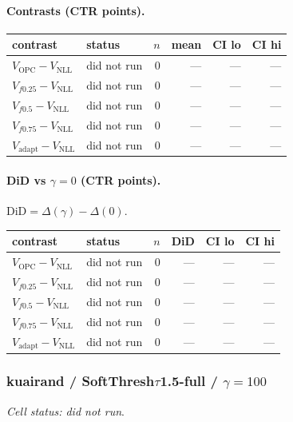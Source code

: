 \documentclass[10pt,a4paper]{article}
\begin{document}
\paragraph{Contrasts (CTR points).}
{\centering\small\begin{tabular}{llrrrr}
\toprule contrast & status & $n$ & mean & CI lo & CI hi \\
\midrule
$V_{\mathrm{OPC}}-V_{\mathrm{NLL}}$ & did not run & 0 & --- & --- & --- \\
$V_{f0.25}-V_{\mathrm{NLL}}$ & did not run & 0 & --- & --- & --- \\
$V_{f0.5}-V_{\mathrm{NLL}}$ & did not run & 0 & --- & --- & --- \\
$V_{f0.75}-V_{\mathrm{NLL}}$ & did not run & 0 & --- & --- & --- \\
$V_{\mathrm{adapt}}-V_{\mathrm{NLL}}$ & did not run & 0 & --- & --- & --- \\
\bottomrule\end{tabular}\par}
\paragraph{DiD vs $\gamma=0$ (CTR points).} $\mathrm{DiD}=\Delta(\gamma)-\Delta(0)$.
{\centering\small\begin{tabular}{llrrrr}
\toprule contrast & status & $n$ & DiD & CI lo & CI hi \\
\midrule
$V_{\mathrm{OPC}}-V_{\mathrm{NLL}}$ & did not run & 0 & --- & --- & --- \\
$V_{f0.25}-V_{\mathrm{NLL}}$ & did not run & 0 & --- & --- & --- \\
$V_{f0.5}-V_{\mathrm{NLL}}$ & did not run & 0 & --- & --- & --- \\
$V_{f0.75}-V_{\mathrm{NLL}}$ & did not run & 0 & --- & --- & --- \\
$V_{\mathrm{adapt}}-V_{\mathrm{NLL}}$ & did not run & 0 & --- & --- & --- \\
\bottomrule\end{tabular}\par}
\bigskip
\subsubsection{kuairand / SoftThresh$\tau$1.5-full / $\gamma=100$}
\emph{Cell status: did not run}.
\end{document}
